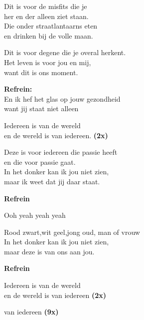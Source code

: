 
Dit is voor de misfits die je \\
her en der alleen ziet staan.\\
Die onder straatlantaarns eten \\
en drinken bij de volle maan. 

Dit is voor degene die je overal herkent. \\
Het leven is voor jou en mij, \\
want dit is ons moment.

\textbf{Refrein:}\\
En ik hef het glas op jouw gezondheid\\
want jij staat niet alleen 

Iedereen is van de wereld \\
en de wereld is van iedereen. \textbf{(2x)}

Deze is voor iedereen die passie heeft \\
en die voor passie gaat. \\
In het donker kan ik jou niet zien,\\
maar ik weet dat jij daar staat. 

\textbf{Refrein}

Ooh yeah yeah yeah 

Rood zwart,wit geel,jong oud, man of vrouw \\
In het donker kan ik jou niet zien, \\
maar deze is van ons aan jou.

\textbf{Refrein}

Iedereen is van de wereld \\
en de wereld is van iedereen \textbf{(2x)}

van iedereen \textbf{(9x)}
